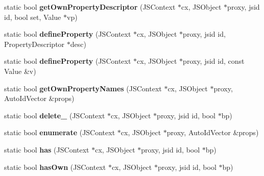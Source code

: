 \begin{DoxyCompactItemize}
\item 
\hypertarget{classjs_1_1_proxy_a8c47be50567cc9510e7a186a068b561c}{static bool {\bfseries get\-Own\-Property\-Descriptor} (J\-S\-Context $\ast$cx, J\-S\-Object $\ast$proxy, jsid id, bool set, Value $\ast$vp)}\label{classjs_1_1_proxy_a8c47be50567cc9510e7a186a068b561c}

\item 
\hypertarget{classjs_1_1_proxy_a6e18e5578e59dbe090c34550827ba8d8}{static bool {\bfseries define\-Property} (J\-S\-Context $\ast$cx, J\-S\-Object $\ast$proxy, jsid id, Property\-Descriptor $\ast$desc)}\label{classjs_1_1_proxy_a6e18e5578e59dbe090c34550827ba8d8}

\item 
\hypertarget{classjs_1_1_proxy_a6c30733851f7366ee274d5bb225cc237}{static bool {\bfseries define\-Property} (J\-S\-Context $\ast$cx, J\-S\-Object $\ast$proxy, jsid id, const Value \&v)}\label{classjs_1_1_proxy_a6c30733851f7366ee274d5bb225cc237}

\item 
\hypertarget{classjs_1_1_proxy_ad826e338e428959ee805ec57911d0325}{static bool {\bfseries get\-Own\-Property\-Names} (J\-S\-Context $\ast$cx, J\-S\-Object $\ast$proxy, Auto\-Id\-Vector \&props)}\label{classjs_1_1_proxy_ad826e338e428959ee805ec57911d0325}

\item 
\hypertarget{classjs_1_1_proxy_aed0b92b233ae191b8f855fd6f8511b22}{static bool {\bfseries delete\-\_\-} (J\-S\-Context $\ast$cx, J\-S\-Object $\ast$proxy, jsid id, bool $\ast$bp)}\label{classjs_1_1_proxy_aed0b92b233ae191b8f855fd6f8511b22}

\item 
\hypertarget{classjs_1_1_proxy_a4d7f3daf219b49dd1c7874241dc7c13d}{static bool {\bfseries enumerate} (J\-S\-Context $\ast$cx, J\-S\-Object $\ast$proxy, Auto\-Id\-Vector \&props)}\label{classjs_1_1_proxy_a4d7f3daf219b49dd1c7874241dc7c13d}

\item 
\hypertarget{classjs_1_1_proxy_a2398c97454809e8d209f23b15b0d0e39}{static bool {\bfseries has} (J\-S\-Context $\ast$cx, J\-S\-Object $\ast$proxy, jsid id, bool $\ast$bp)}\label{classjs_1_1_proxy_a2398c97454809e8d209f23b15b0d0e39}

\item 
\hypertarget{classjs_1_1_proxy_a0249d71d32bb8b87ae2ac7e0a6ba84d6}{static bool {\bfseries has\-Own} (J\-S\-Context $\ast$cx, J\-S\-Object $\ast$proxy, jsid id, bool $\ast$bp)}\label{classjs_1_1_proxy_a0249d71d32bb8b87ae2ac7e0a6ba84d6}


\end{DoxyCompactItemize}
